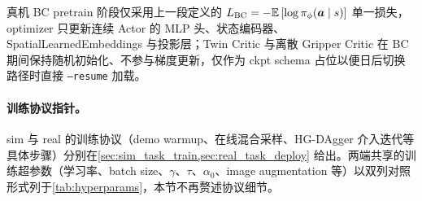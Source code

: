 真机 BC pretrain 阶段仅采用上一段定义的 $L_\text{BC} = -\mathbb{E}\left[\log \pi_\phi(\bm{a}\mid s)\right]$ 单一损失，optimizer 只更新连续 Actor 的 MLP 头、状态编码器、SpatialLearnedEmbeddings 与投影层；Twin Critic 与离散 Gripper Critic 在 BC 期间保持随机初始化、不参与梯度更新，仅作为 ckpt schema 占位以便日后切换路径时直接 \texttt{--resume} 加载。

\paragraph{训练协议指针。}sim 与 real 的训练协议（demo warmup、在线混合采样、HG-DAgger 介入迭代等具体步骤）分别在\cref{sec:sim_task_train,sec:real_task_deploy} 给出。两端共享的训练超参数（学习率、batch size、$\gamma$、$\tau$、$\alpha_0$、image augmentation 等）以双列对照形式列于\cref{tab:hyperparams}，本节不再赘述协议细节。

